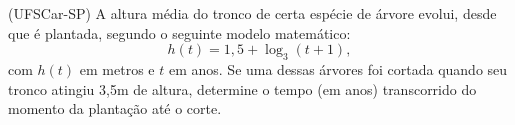 \begin{secExercicios}

\begin{exer}
    (UFSCar-SP) A altura média do tronco de certa espécie de árvore evolui, desde que é plantada, segundo o seguinte modelo matemático:
    \begin{equation*}
        h(t)=1,5 +\log_3 (t+1),
    \end{equation*}
    com $h(t)$ em metros e $t$ em anos. Se uma dessas árvores foi cortada quando seu tronco atingiu 3,5m de altura, determine o tempo (em anos) transcorrido do momento da plantação até o corte.
\end{exer}

\end{secExercicios}


